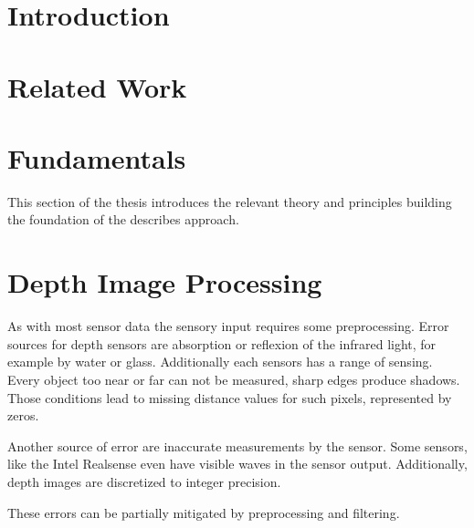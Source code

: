\documentclass[doktyp=marbeit,fontsize=12pt,sprache=english,hausschrift=true,fleqn]{TUBAFarbeiten}
\begin{document}
\maketitle
\TUBAFErklaerungsseite%

\tableofcontents
\newpage



\newpage

\section{Introduction}

\newpage

\section{Related Work}

\newpage

\section{Fundamentals}

This section of the thesis introduces the relevant theory and principles building the foundation of the describes approach.






\newpage

\section{Depth Image Processing}

As with most sensor data the sensory input requires some preprocessing.
Error sources for depth sensors are absorption or reflexion of the infrared light, for example by water or glass.
Additionally each sensors has a range of sensing.
Every object too near or far can not be measured, sharp edges produce shadows.
Those conditions lead to missing distance values for such pixels, represented by zeros.

Another source of error are inaccurate measurements by the sensor.
Some sensors, like the Intel Realsense even have visible waves in the sensor output.
Additionally, depth images are discretized to integer precision.

These errors can be partially mitigated by preprocessing and filtering.
\end{document}
